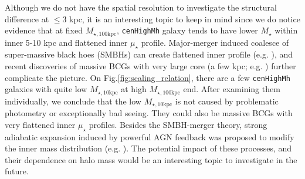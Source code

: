 \documentclass{emulateapj}
\def\rbcg{\texttt{cenHighMh}}
\def\mstar{{$M_{\star}$}}
\def\minn{{$M_{\star,10\mathrm{kpc}}$}}
\def\mtot{{$M_{\star,100\mathrm{kpc}}$}}
\def\mden{{$\mu_{\star}$}}
\newcommand{\update}[1]{\textcolor{Bittersweet}{#1}}
\begin{document}
\begin{CJK*}{UTF8}{gbsn}
    \update{
    Although we do not have the spatial resolution to investigate the structural 
    difference at $\leq 3$ kpc, it is an interesting topic to keep in mind since we do 
    notice evidence that at fixed \mtot{}, \rbcg{} galaxy tends to have lower \mstar{} 
    within inner 5-10 kpc and flattened inner \mden{} profile. 
    }
    Major-merger induced coalesce of super-massive black hoes (SMBHs) can create flattened 
    inner profile (e.g. \citealt{Milosavljevi2002}), and recent discoveries of massive 
    BCGs with very large core (a few kpc; e.g. \citealt{Postman2012, LopezCruz2014}) 
    further complicate the picture.
    On Fig.\ref{fig:scaling_relation}, there are a few \rbcg{} galaxies with quite low 
    \minn{} at high \mtot{} end. 
    After examining them individually, we conclude that the low \minn{} is not caused 
    by problematic photometry or exceptionally bad seeing. 
    They could also be massive BCGs with very flattened inner \mden{} profiles.  
    Besides the SMBH-merger theory, strong adiabatic expansion induced by powerful AGN 
    feedback was proposed to modify the inner mass distribution (e.g. \citealt{Fan2008}). 
    The potential impact of these processes, and their dependence on halo mass would be 
    an interesting topic to investigate in the future.
     

\end{CJK*}
\end{document}
